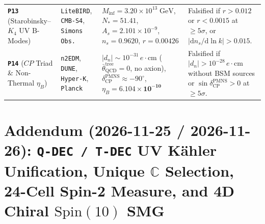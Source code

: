 \documentclass[11pt,a4paper]{article}
\begin{document}
\begin{table}[htbp]
\begin{tabularx}{\textwidth}{@{}p{}p{}p{}X@{}}
\textbf{\texttt{P13}} (Starobinsky--$K_4$ UV B-Modes) & \texttt{LiteBIRD}, \texttt{CMB-S4}, \texttt{Simons Obs.} & $M_{\mathrm{inf}}=3.20\times 10^{13}\;\mathrm{GeV}$, $N_*=51.41$, $A_s=2.101\times 10^{-9}$, $n_s=0.9620$, $r=\mathbf{0.00426}$ & Falsified if $r > 0.012$ or $r < 0.0015$ at $\ge 5\sigma$, or $|\mathrm{d}n_s/\mathrm{d}\ln k| > 0.015$. \\
\textbf{\texttt{P14}} ($CP$ Triad \& Non-Thermal $\eta_B$) & \texttt{n2EDM}, \texttt{DUNE}, \texttt{Hyper-K}, \texttt{Planck} & $|d_n|\sim 10^{-31}\,e\cdot\mathrm{cm}$ ($\bar{\theta}_{\mathrm{QCD}}^{\mathrm{tree}}=0$, no axion), $\delta_{\mathrm{CP}}^{\mathrm{PMNS}}\approx -90^\circ$, $\eta_B=\mathbf{6.104\times 10^{-10}}$ & Falsified if $|d_n| > 10^{-28}\,e\cdot\mathrm{cm}$ without BSM sources or $\sin\delta_{\mathrm{CP}}^{\mathrm{PMNS}} > 0$ at $\ge 5\sigma$. \\
\bottomrule
\end{tabularx}
\end{table}

\section{Addendum (2026-11-25 / 2026-11-26): \texttt{Q-DEC / T-DEC} UV K\"ahler Unification, Unique \texorpdfstring{$\mathbb{C}$}{C} Selection, 24-Cell Spin-2 Measure, and 4D Chiral \texorpdfstring{$\mathrm{Spin}(10)$}{Spin(10)} SMG}
\label{sec:p22-addendum-2026-11-25}
\end{document}
